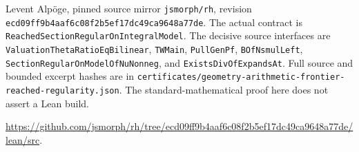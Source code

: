 Levent Alp\"oge, pinned source mirror \texttt{jsmorph/rh}, revision
\texttt{ecd09ff9b4aaf6c08f2b5ef17dc49ca9648a77de}.
The actual contract is \texttt{ReachedSectionRegularOnIntegralModel}.
The decisive source interfaces are \texttt{ValuationThetaRatioEqBilinear},
\texttt{TWMain}, \texttt{PullGenPf}, \texttt{BOfNsmulLeft},
\texttt{SectionRegularOnModelOfNuNonneg}, and
\texttt{ExistsDivOfExpandsAt}.  Full source and bounded excerpt hashes
are in \texttt{certificates/geometry-arithmetic-frontier-reached-regularity.json}.
The standard-mathematical proof here does not assert a Lean build.\par
\url{https://github.com/jsmorph/rh/tree/ecd09ff9b4aaf6c08f2b5ef17dc49ca9648a77de/lean/src}.

